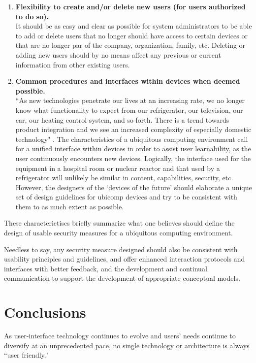 \documentclass{article}
\begin{document}
\begin{enumerate}
 \item \textbf{Flexibility to create and/or delete new users (for users authorized to do so).}\\
 It should be as easy and clear as possible for system administrators to be able to add or delete users that no longer should have access to certain devices or that are no longer par of the company, organization, family, etc.  Deleting or adding new users should by no means affect any previous or current information from other existing users.

 \item \textbf{Common procedures and interfaces within devices when deemed possible.}\\
 ``As new technologies penetrate our lives at an increasing rate, we no longer know what functionality to expect from our refrigerator, our television, our car, our heating control system, and so forth. There is a trend towards product integration and we see an increased complexity of especially domestic technology" \cite{petersen2002usability}.
The characteristics of a ubiquitous computing environment call for a unified interface within devices in order to assist user learnability, as the user continuously encounters new devices. Logically, the interface used for the equipment in a hospital room or nuclear reactor and that used by a refrigerator will unlikely be similar in content, capabilities, security, etc. However, the designers of the `devices of the future' should elaborate a unique set of design guidelines for ubicomp devices and try to be consistent with them to as much extent as possible. 
\end{enumerate}

These characterictiscs briefly summarize what one believes should define the design of usable security measures for a ubiquitous computing environment.  

Needless to say, any security measure designed should also be consistent with usability principles and guidelines, and offer enhanced interaction protocols and interfaces with better feedback, and the development and continual communication to support the development of appropriate conceptual models. 


\section{Conclusions}
As user-interface technology continues to evolve and users' needs continue to diversify at an unprecedented pace, no single technology or architecture is always ``user friendly." 
\end{document}
